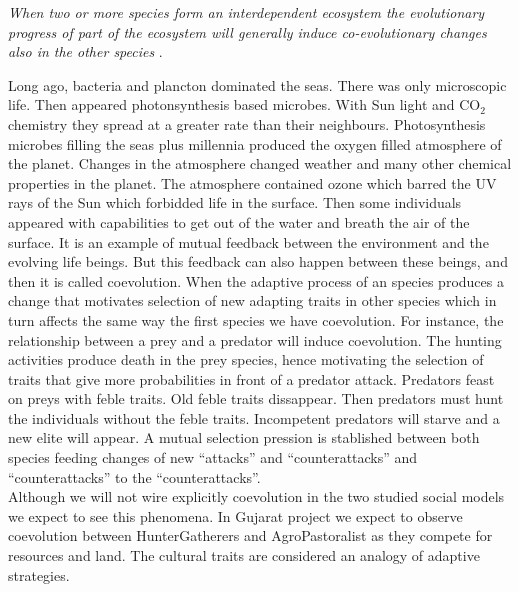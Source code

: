 \documentclass[11pt,oneside,a4paper,openright]{report}
\begin{document}
\textit{When two or more species form an interdependent ecosystem the evolutionary progress of part of the ecosystem will generally induce co-evolutionary changes also in the other species} \cite[p.154]{Gross2008}.

Long ago, bacteria and plancton dominated the seas. There was only microscopic life. Then appeared photonsynthesis
based microbes. With Sun light and CO$_2$ chemistry they spread at a greater rate than their neighbours. Photosynthesis
microbes filling the seas plus millennia produced the oxygen filled atmosphere of the planet. Changes in the atmosphere
changed weather and many other chemical properties in the planet. The atmosphere contained ozone which barred the 
UV rays of the Sun which forbidded life in the surface. Then some individuals appeared with capabilities to get out of 
the water and breath the air of the surface. It is an example of mutual feedback between the environment and the evolving 
life beings. But this feedback can also happen between these beings, and then it is called coevolution\cite{Dawkins1990}.
When the adaptive process of an species produces a change that motivates selection of new adapting traits in other
species which in turn affects the same way the first species we have coevolution. For instance, the relationship 
between a prey and a predator will induce coevolution. The hunting activities produce death in the prey species, hence
motivating the selection of traits that give more probabilities in front of a predator attack. Predators feast on preys 
with feble traits. Old feble traits dissappear. Then predators must hunt the individuals without the feble traits. Incompetent predators will starve and a new elite will appear. A mutual selection pression is stablished between both species feeding changes of new ``attacks'' and ``counterattacks'' and ``counterattacks'' to the ``counterattacks''.\\

Although we will not wire explicitly coevolution in the two studied social models we expect to see this phenomena. In Gujarat project we expect to observe coevolution between HunterGatherers and AgroPastoralist as they compete for resources and land. The cultural traits are considered an analogy of adaptive strategies. 
\end{document}

